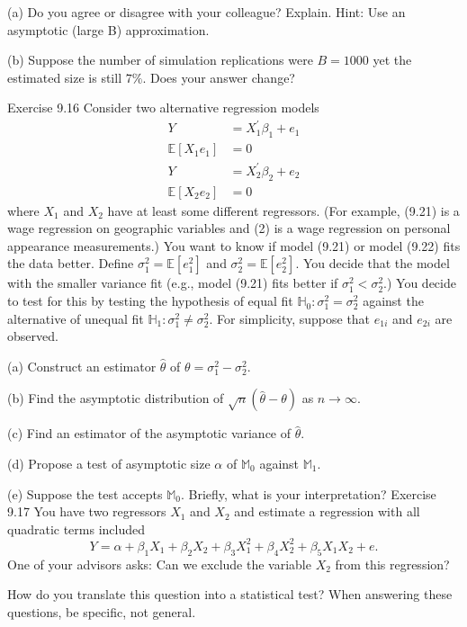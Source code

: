 \documentclass[10pt]{article}
\begin{document}
(a) Do you agree or disagree with your colleague? Explain. Hint: Use an asymptotic (large B) approximation.

(b) Suppose the number of simulation replications were $B=1000$ yet the estimated size is still $7 \%$. Does your answer change?

Exercise 9.16 Consider two alternative regression models
$$
\begin{aligned}
Y &=X_{1}^{\prime} \beta_{1}+e_{1} \\
\mathbb{E}\left[X_{1} e_{1}\right] &=0 \\
Y &=X_{2}^{\prime} \beta_{2}+e_{2} \\
\mathbb{E}\left[X_{2} e_{2}\right] &=0
\end{aligned}
$$
where $X_{1}$ and $X_{2}$ have at least some different regressors. (For example, (9.21) is a wage regression on geographic variables and (2) is a wage regression on personal appearance measurements.) You want to know if model (9.21) or model (9.22) fits the data better. Define $\sigma_{1}^{2}=\mathbb{E}\left[e_{1}^{2}\right]$ and $\sigma_{2}^{2}=\mathbb{E}\left[e_{2}^{2}\right]$. You decide that the model with the smaller variance fit (e.g., model (9.21) fits better if $\sigma_{1}^{2}<\sigma_{2}^{2}$.) You decide to test for this by testing the hypothesis of equal fit $\mathbb{H}_{0}: \sigma_{1}^{2}=\sigma_{2}^{2}$ against the alternative of unequal fit $\mathbb{H}_{1}: \sigma_{1}^{2} \neq \sigma_{2}^{2}$. For simplicity, suppose that $e_{1 i}$ and $e_{2 i}$ are observed.

(a) Construct an estimator $\widehat{\theta}$ of $\theta=\sigma_{1}^{2}-\sigma_{2}^{2}$.

(b) Find the asymptotic distribution of $\sqrt{n}(\widehat{\theta}-\theta)$ as $n \rightarrow \infty$.

(c) Find an estimator of the asymptotic variance of $\widehat{\theta}$.

(d) Propose a test of asymptotic size $\alpha$ of $\mathbb{M}_{0}$ against $\mathbb{M}_{1}$.

(e) Suppose the test accepts $\mathbb{M}_{0}$. Briefly, what is your interpretation? Exercise 9.17 You have two regressors $X_{1}$ and $X_{2}$ and estimate a regression with all quadratic terms included
$$
Y=\alpha+\beta_{1} X_{1}+\beta_{2} X_{2}+\beta_{3} X_{1}^{2}+\beta_{4} X_{2}^{2}+\beta_{5} X_{1} X_{2}+e .
$$
One of your advisors asks: Can we exclude the variable $X_{2}$ from this regression?

How do you translate this question into a statistical test? When answering these questions, be specific, not general.
\end{document}

